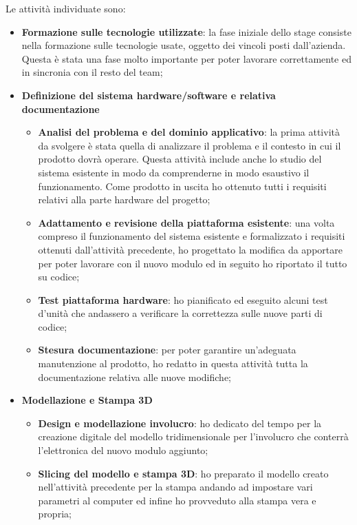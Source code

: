 Le attività individuate sono:
\begin{itemize}
\item \textbf{Formazione sulle tecnologie utilizzate}: la fase iniziale dello stage consiste nella formazione sulle tecnologie usate, oggetto dei vincoli posti dall'azienda. Questa è stata una fase molto importante per poter lavorare correttamente ed in sincronia con il resto del team;

\item \textbf{Definizione del sistema hardware/software e relativa documentazione}
\begin{itemize}
	\item \textbf{Analisi del problema e del dominio applicativo}: la prima attività da svolgere è stata quella di analizzare il problema e il contesto in cui il prodotto dovrà operare. Questa attività include anche lo studio del sistema esistente in modo da comprenderne in modo esaustivo il funzionamento. Come prodotto in uscita ho ottenuto tutti i requisiti relativi alla parte hardware del progetto;
	\item \textbf{Adattamento e revisione della piattaforma esistente}: una volta compreso il funzionamento del sistema esistente e formalizzato i requisiti ottenuti dall'attività precedente, ho progettato la modifica da apportare per poter lavorare con il nuovo modulo ed in seguito ho riportato il tutto su codice;
	\item \textbf{Test piattaforma hardware}: ho pianificato ed eseguito alcuni test d'unità che andassero a verificare la correttezza sulle nuove parti di codice;
	\item \textbf{Stesura documentazione}: per poter garantire un'adeguata manutenzione al prodotto, ho redatto in questa attività tutta la documentazione relativa alle nuove modifiche;
\end{itemize}

\item \textbf{Modellazione e Stampa 3D}
\begin{itemize}
	\item \textbf{Design e modellazione involucro}: ho dedicato del tempo per la creazione digitale del modello tridimensionale per l'involucro che conterrà l'elettronica del nuovo modulo aggiunto;
	\item \textbf{Slicing del modello e stampa 3D}: ho preparato il modello creato nell'attività precedente per la stampa andando ad impostare vari parametri al computer ed infine ho provveduto alla stampa vera e propria;
\end{itemize}


\end{itemize}
